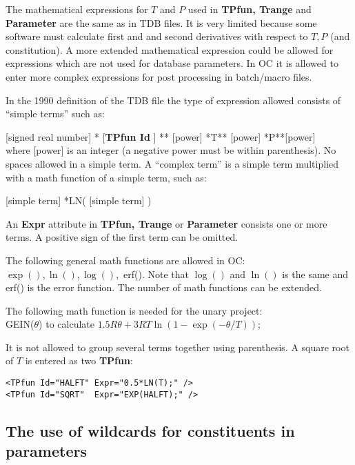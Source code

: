 \documentclass{article}
\begin{document}
The mathematical expressions for $T$ and $P$ used in {\bf TPfun,
  Trange} and {\bf Parameter} are the same as in TDB files.  It is
very limited because some software must calculate first and and second
derivatives with respect to $T, P$ (and constitution).  A more
extended mathematical expression could be allowed for expressions
which are not used for database parameters.  In OC it is allowed to
enter more complex expressions for post processing in batch/macro
files.

In the 1990 definition of the TDB file the type of expression allowed
consists of ``simple terms'' such as:

[signed real number] * [{\bf TPfun Id} ] ** [power] *T** [power] *P**[power]\\
where [power] is an integer (a negative power must be within
parenthesis).  No spaces allowed in a simple term.  A ``complex term''
is a simple term multiplied with a math function of a simple term,
such as:

[simple term] *LN( [simple term] )

An {\bf Expr} attribute in {\bf TPfun, Trange} or {\bf Parameter}
consists one or more terms.  A positive sign of the first term can be
omitted.
  
The following general math functions are allowed in OC:\\ $\exp(),
\ln(), \log(),$ erf().  Note that $\log()$ and $\ln()$ is the same and
erf() is the error function.  The number of math functions can be
extended.

The following math function is needed for the unary
project:\\ GEIN($\theta$) to calculate
$1.5R\theta+3RT\ln(1-\exp(-\theta/T));$

It is not allowed to group several terms together using parenthesis.
A square root of $T$ is entered as two {\bf TPfun}:

\begin{verbatim}
<TPfun Id="HALFT" Expr="0.5*LN(T);" />
<TPfun Id="SQRT"  Expr="EXP(HALFT);" />
\end{verbatim}

\subsection{The use of wildcards for constituents in parameters}\label{sec:wildcard}
\end{document}
